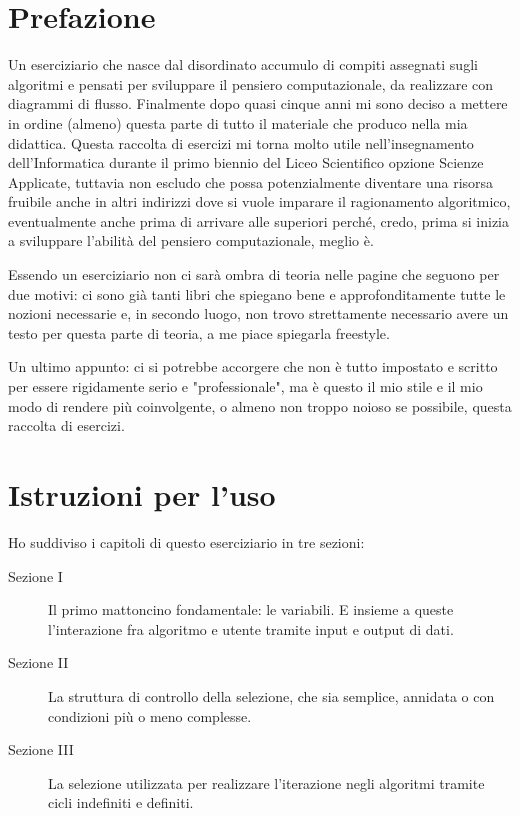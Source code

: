 \begingroup
\let\clearpage\relax
\let\cleardoublepage\relax
\let\cleardoublepage\relax

\chapter*{Prefazione}
Un eserciziario che nasce dal disordinato accumulo di compiti assegnati sugli algoritmi e pensati per sviluppare il pensiero computazionale, da realizzare con diagrammi di flusso. Finalmente dopo quasi cinque anni mi sono deciso a mettere in ordine (almeno) questa parte di tutto il materiale che produco nella mia didattica. Questa raccolta di esercizi mi torna molto utile nell'insegnamento dell'Informatica durante il primo biennio del Liceo Scientifico opzione Scienze Applicate, tuttavia non escludo che possa potenzialmente diventare una risorsa fruibile anche in altri indirizzi dove si vuole imparare il ragionamento algoritmico, eventualmente anche prima di arrivare alle superiori perché, credo, prima si inizia a sviluppare l'abilità del pensiero computazionale, meglio è.

Essendo un eserciziario non ci sarà ombra di teoria nelle pagine che seguono per due motivi: ci sono già tanti libri che spiegano bene e approfonditamente tutte le nozioni necessarie e, in secondo luogo, non trovo strettamente necessario avere un testo per questa parte di teoria, a me piace spiegarla freestyle.

Un ultimo appunto: ci si potrebbe accorgere che non è tutto impostato e scritto per essere rigidamente serio e "professionale", ma è questo il mio stile e il mio modo di rendere più coinvolgente, o almeno non troppo noioso se possibile, questa raccolta di esercizi.

\chapter*{Istruzioni per l'uso}
Ho suddiviso i capitoli di questo eserciziario in tre sezioni:

\begin{description}
	\item[Sezione I] Il primo mattoncino fondamentale: le variabili. E insieme a queste l'interazione fra algoritmo e utente tramite input e output di dati.
	\item[Sezione II] La struttura di controllo della selezione, che sia semplice, annidata o con condizioni più o meno complesse.
	\item[Sezione III] La selezione utilizzata per realizzare l'iterazione negli algoritmi tramite cicli indefiniti e definiti.
\end{description}

